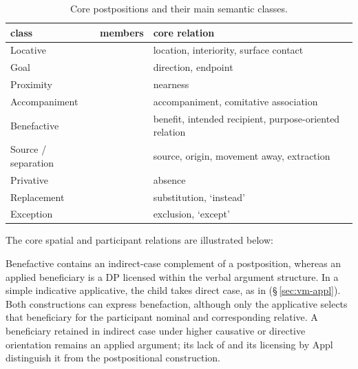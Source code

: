 \begin{table}[ht]
  \footnotesize
  \caption{Core postpositions and their main semantic classes.}
  \label{tab:nm-postpositions}
  \begin{tabularx}{\textwidth}{l l L}
    \toprule
    {\sc class} & {\sc members} & {\sc core relation} \\
    \midrule
    Locative &  & location, interiority, surface contact \\
    Goal &  & direction, endpoint \\
    Proximity &  & nearness \\
    Accompaniment &  & accompaniment, comitative association \\
    Benefactive &  & benefit, intended recipient, purpose-oriented relation \\
    Source / separation &  & source, origin, movement away, extraction \\
    Privative &  & absence \\
    Replacement &  & substitution, `instead' \\
    Exception &  & exclusion, `except' \\
    \bottomrule
  \end{tabularx}
\end{table}
\FloatBarrier

\noindent The core spatial and participant relations are illustrated
below:

\pex
\a {} 
\a {} 
\a {} 
\a {} 
\a {} 
\a {} 
\a {} 
\a {} 
\a {} 
\xe

Benefactive  contains an indirect-case complement of a
postposition, whereas an applied beneficiary is a DP licensed within the verbal
argument structure. In a simple indicative applicative, the child takes direct
case, as in   (§\,\ref{sec:vm-appl}). Both constructions can
express benefaction, although only the applicative selects that beneficiary
for the participant nominal and corresponding relative. A beneficiary retained
in indirect case under higher causative or directive orientation remains an
applied argument; its lack of  and its licensing by Appl distinguish
it from the postpositional construction.

